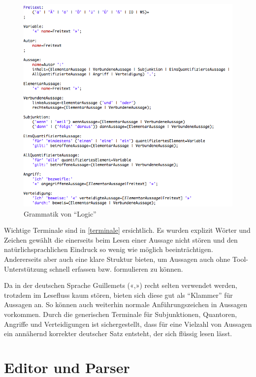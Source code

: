\documentclass[11pt,a4paper,bibtotocnumbered]{scrreprt}
\begin{document}
\begin{figure}[htbp]
\centering
\includegraphics[width=1\textwidth]{img/grammatik.png}
\caption{Grammatik von \enquote{Logic}}
\label{grammatik}
\end{figure}

Wichtige Terminale sind in \autoref{terminale} ersichtlich.
Es wurden explizit Wörter und Zeichen gewählt die einerseits beim Lesen einer Aussage nicht stören und den natürlichsprachlichen Eindruck so wenig wie möglich beeinträchtigen. Andererseits aber auch eine klare Struktur bieten, um Aussagen auch ohne Tool-Unterstützung schnell erfassen bzw. formulieren zu können.

Da in der deutschen Sprache Guillemets («,») recht selten verwendet werden, trotzdem im Lesefluss kaum stören, bieten sich diese gut als \enquote{Klammer} für Aussagen an.
So können auch weiterhin normale Anführungszeichen in Aussagen vorkommen.
Durch die generischen Terminale für Subjunktionen, Quantoren, Angriffe und Verteidigungen ist sichergestellt, dass für eine Vielzahl von Aussagen ein annähernd korrekter deutscher Satz entsteht, der sich flüssig lesen lässt.


\section{Editor und Parser}
\end{document}
